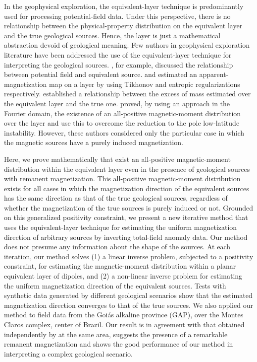 In the geophysical exploration, the equivalent-layer technique is predominantly used for processing potential-field data. 
Under this perspective, there is no relationship between the physical-property distribution on the equivalent layer 
and the true geological sources. Hence, the layer is just a mathematical abstraction devoid of geological meaning. 
Few authors in geophysical exploration literature have been addressed the use of the equivalent-layer technique for interpreting
the geological sources. \cite{pedersen1991}, for example, discussed the relationship between potential field and equivalent source. 
\cite{medeiros_silva1996} and \cite{silva-etal2010} estimated an apparent-magnetization map on a layer by using Tikhonov and 
entropic regularizations respectively. \cite{siqueira_etal_2017} established a relationship between the excess of mass estimated 
over the equivalent layer and the true one. \cite{li_etal_2014} proved, by using an approach in the Fourier domain, 
the existence of an all-positive magnetic-moment distribution over the layer and use this to overcome the reduction to the pole low-latitude instability. 
However, these authors considered only the particular case in which the magnetic sources have a purely induced magnetization.

Here, we prove mathematically that exist an all-positive magnetic-moment 
distribution within the equivalent layer even in the 
presence of geological sources with remanent magnetization. This all-positive 
magnetic-moment distribution exists for 
all cases in which the magnetization direction of the equivalent sources has the 
same direction as that of the true geological sources, 
regardless of whether the magnetization of the true sources is purely induced 
or not. Grounded on this generalized positivity constraint, 
we present a new iterative method that uses the equivalent-layer technique 
for estimating the uniform magnetization direction of 
arbitrary sources by inverting total-field anomaly data. Our method does not 
presume any information about the shape of the sources. 
At each iteration, our method solves (1) a linear inverse problem, subjected to 
a positivity constraint, for estimating the magnetic-moment 
distribution within a planar equivalent layer of dipoles, and (2) a 
non-linear inverse problem for estimating the uniform magnetization 
direction of the equivalent sources. Tests with synthetic data generated 
by different geological scenarios show that the estimated magnetization
direction converges to that of the true sources. We also applied our method to 
field data from the Goi{\' a}s alkaline province (GAP), 
over the Montes Claros complex, center of Brazil. Our result is in agreement 
with that obtained independently by \cite{zhang_etal_2018} 
at the same area, suggests the presence of a remarkable remanent magnetization 
and shows the good performance of our method in interpreting 
a complex geological scenario.
